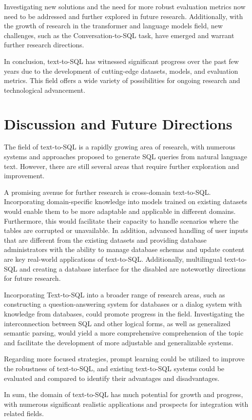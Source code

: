 Investigating new solutions and the need for more robust evaluation metrics now need to be addressed and further explored in future research. Additionally, with the growth of research in the transformer and language models field, new challenges, such as the Conversation-to-SQL task, have emerged and warrant further research directions.

In conclusion, text-to-SQL has witnessed significant progress over the past few years due to the development of cutting-edge datasets, models, and evaluation metrics. This field offers a wide variety of possibilities for ongoing research and technological advancement.

\section{Discussion and Future Directions}

The field of text-to-SQL is a rapidly growing area of research, with numerous systems and approaches proposed to generate SQL queries from natural language text. However, there are still several areas that require further exploration and improvement.

A promising avenue for further research is cross-domain text-to-SQL. Incorporating domain-specific knowledge into models trained on existing datasets would enable them to be more adaptable and applicable in different domains. Furthermore, this would facilitate their capacity to handle scenarios where the tables are corrupted or unavailable. In addition, advanced handling of user inputs that are different from the existing datasets and providing database administrators with the ability to manage database schemas and update content are key real-world applications of text-to-SQL. Additionally, multilingual text-to-SQL and creating a database interface for the disabled are noteworthy directions for future research.

Incorporating Text-to-SQL into a broader range of research areas, such as constructing a question-answering system for databases or a dialog system with knowledge from databases, could promote progress in the field. Investigating the interconnection between SQL and other logical forms, as well as generalized semantic parsing, would yield a more comprehensive comprehension of the topic and facilitate the development of more adjustable and generalizable systems.

Regarding more focused strategies, prompt learning could be utilized to improve the robustness of text-to-SQL, and existing text-to-SQL systems could be evaluated and compared to identify their advantages and disadvantages.

In sum, the domain of text-to-SQL has much potential for growth and progress, with numerous significant realistic applications and prospects for integration with related fields.